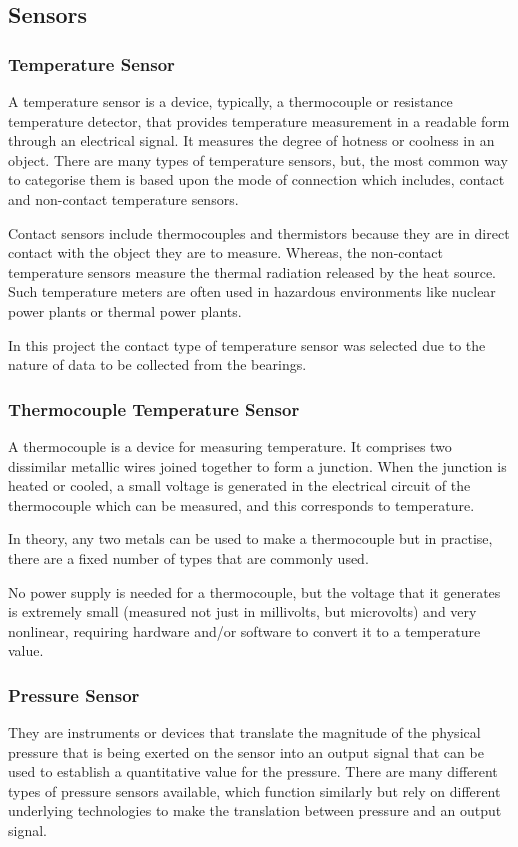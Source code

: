 \subsection{Sensors}
\subsubsection{Temperature Sensor}
A temperature sensor is a device, typically, a thermocouple or resistance temperature detector, that provides temperature measurement in a readable form through an electrical signal. It measures the degree of hotness or coolness in an object. There are many types of temperature sensors, but, the most common way to categorise them is based upon the mode of connection which includes, contact and non-contact temperature sensors\cite{noauthor_temperature_2019}. 

Contact sensors include thermocouples and thermistors because they are in direct contact with the object they are to measure. Whereas, the non-contact temperature sensors measure the thermal radiation released by the heat source. Such temperature meters are often used in hazardous environments like nuclear power plants or thermal power plants. 

In this project the contact type of temperature sensor was selected due to the nature of data to be collected from the bearings. 
\subsubsection{Thermocouple Temperature Sensor}
A thermocouple is a device for measuring temperature. It comprises two dissimilar metallic wires joined together to form a junction. When the junction is heated or cooled, a small voltage is generated in the electrical circuit of the thermocouple which can be measured, and this corresponds to temperature. 

In theory, any two metals can be used to make a thermocouple but in practise, there are a fixed number of types that are commonly used.  

No power supply is needed for a thermocouple, but the voltage that it generates is extremely small (measured not just in millivolts, but microvolts) and very nonlinear, requiring hardware and/or software to convert it to a temperature value.
\subsubsection{Pressure Sensor}
They are instruments or devices that translate the magnitude of the physical pressure that is being exerted on the sensor into an output signal that can be used to establish a quantitative value for the pressure. There are many different types of pressure sensors available, which function similarly but rely on different underlying technologies to make the translation between pressure and an output signal\cite{noauthor_types_nodate}.  

